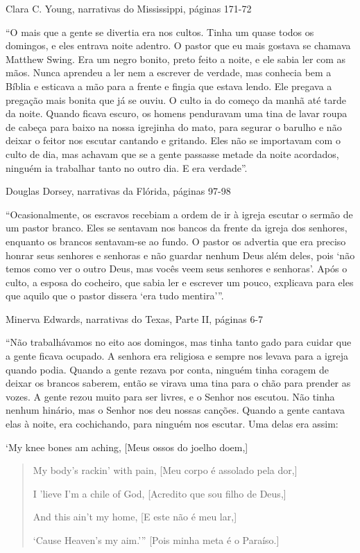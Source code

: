 Clara C. Young, narrativas do Mississippi, páginas 171-72

``﻿O mais que a gente se divertia era nos cultos. Tinha um quase todos
os domingos, e eles entrava noite adentro. O pastor que eu mais gostava
se chamava Matthew Swing. Era um negro bonito, preto feito a noite, e
ele sabia ler com as mãos. Nunca aprendeu a ler nem a escrever de
verdade, mas conhecia bem a Bíblia e esticava a mão para a frente e
fingia que estava lendo. Ele pregava a pregação mais bonita que já se
ouviu. O culto ia do começo da manhã até tarde da noite. Quando ficava
escuro, os homens penduravam uma tina de lavar roupa de cabeça para
baixo na nossa igrejinha do mato, para segurar o barulho e não deixar o
feitor nos escutar cantando e gritando. Eles não se importavam com o
culto de dia, mas achavam que se a gente passasse metade da noite
acordados, ninguém ia trabalhar tanto no outro dia. E era verdade''.

Douglas Dorsey, narrativas da Flórida, páginas 97-98

``Ocasionalmente, os escravos recebiam a ordem de ir à igreja escutar o
sermão de um pastor branco. Eles se sentavam nos bancos da frente da
igreja dos senhores, enquanto os brancos sentavam-se ao fundo. O pastor
os advertia que era preciso honrar seus senhores e senhoras e não
guardar nenhum Deus além deles, pois `não temos como ver o outro Deus,
mas vocês veem seus senhores e senhoras'. Após o culto, a esposa do
cocheiro, que sabia ler e escrever um pouco, explicava para eles que
aquilo que o pastor dissera `era tudo mentira'''.

Minerva Edwards, narrativas do Texas, Parte II, páginas 6-7

``Não trabalhávamos no eito aos domingos, mas tinha tanto gado para
cuidar que a gente ficava ocupado. A senhora era religiosa e sempre nos
levava para a igreja quando podia. Quando a gente rezava por conta,
ninguém tinha coragem de deixar os brancos saberem, então se virava uma
tina para o chão para prender as vozes. A gente rezou muito para ser
livres, e o Senhor nos escutou. Não tinha nenhum hinário, mas o Senhor
nos deu nossas canções. Quando a gente cantava elas à noite, era
cochichando, para ninguém nos escutar. Uma delas era assim:

`My knee bones am aching, {[}Meus ossos do joelho doem,{]}

\begin{quote}
My body's rackin' with pain, {[}Meu corpo é assolado pela dor,{]}

I 'lieve I'm a chile of God, {[}Acredito que sou filho de Deus,{]}

And this ain't my home, {[}E este não é meu lar,{]}

`Cause Heaven's my aim.''' {[}Pois minha meta é o Paraíso.{]}
\end{quote}

